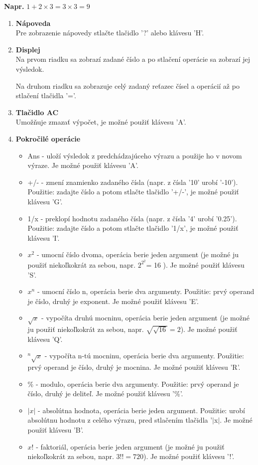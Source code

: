 \documentclass[11pt, a4paper]{article}
\begin{document}
\textbf{Napr.} $1 + 2 \times 3 = 3 \times 3 = 9$
\begin{enumerate}
    \item \textbf{Nápoveda}\\
    Pre zobrazenie nápovedy stlačte tlačidlo '?' alebo klávesu 'H'.
    
    \item \textbf{Displej}\\
    Na prvom riadku sa zobrazí zadané číslo a po stlačení operácie sa zobrazí jej výsledok.
    
    Na druhom riadku sa zobrazuje celý zadaný reťazec čísel a operácií až po stlačení tlačidla '='.
    
    \item \textbf{Tlačidlo AC}\\
    Umožňuje zmazať výpočet, je možné použiť klávesu 'A'.
    
    \item \textbf{Pokročilé operácie}
    \begin{itemize}
        \item Ans - uloží výsledok z predchádzajúceho výrazu a použije ho v novom výraze. Je možné použiť klávesu 'A'.
        \item +/- - zmení znamienko zadaného čísla (napr. z čísla '10' urobí '-10'). Použitie: zadajte číslo a potom stlačte tlačidlo '+/-', je možné použiť klávesu 'G'.
        \item 1/x - preklopí hodnotu zadaného čísla (napr. z čísla '4' urobí '0.25'). Použitie: zadajte číslo a potom stlačte tlačidlo '1/x', je možné použiť klávesu 'I'.
        
        \item $x^2$ - umocní číslo dvoma, operácia berie jeden argument (je možné ju použiť niekoľkokrát za sebou, napr. $2^{2^2}$= 16 ). Je možné použiť klávesu 'S'.
        \item $x^n$ - umocní číslo n, operácia berie dva argumenty. Použitie: prvý operand je číslo, druhý je exponent. Je možné použiť klávesu 'E'.
        \item $\sqrt{x}$ - vypočíta druhú mocninu, operácia berie jeden argument (je možné ju použiť niekoľkokrát za sebou, napr. $\sqrt{\sqrt{16}} = 2$). Je možné použiť klávesu 'Q'.
        \item $^n\sqrt{x}$ - vypočíta n-tú mocninu, operácia berie dva argumenty. Použitie: prvý operand je číslo, druhý je mocnina. Je možné použiť klávesu 'R'.
        \item \% - modulo, operácia berie dva argumenty. Použitie: prvý operand je číslo, druhý je deliteľ. Je možné použiť klávesu '\%'.
        \item $|x|$ - absolútna hodnota, operácia berie jeden argument. Použitie: urobí absolútnu hodnotu z celého výrazu, pred stlačením tlačidla '$|$x$|$. Je možné použiť klávesu 'B'.
        \item $x!$ - faktoriál, operácia berie jeden argument (je možné ju použiť niekoľkokrát za sebou, napr. $3!! = 720$). Je možné použiť klávesu '!'.
    \end{itemize}
    

\end{enumerate}
\end{document}
